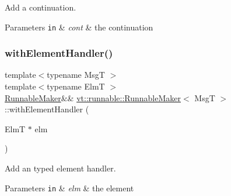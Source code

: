 Add a continuation. 


\begin{DoxyParams}[1]{Parameters}
\mbox{\tt in}  & {\em cont} & the continuation \\
\hline
\end{DoxyParams}
\mbox{\label{structvt_1_1runnable_1_1_runnable_maker_a1b37afe7a5ab185c29e85e0d6ebbbc82}} 
\subsubsection{\texorpdfstring{with\+Element\+Handler()}{withElementHandler()}}
{\footnotesize\ttfamily template$<$typename MsgT $>$ \\
template$<$typename ElmT $>$ \\
\hyperlink{structvt_1_1runnable_1_1_runnable_maker}{Runnable\+Maker}\&\& \hyperlink{structvt_1_1runnable_1_1_runnable_maker}{vt\+::runnable\+::\+Runnable\+Maker}$<$ MsgT $>$\+::with\+Element\+Handler (\begin{DoxyParamCaption}\item[{ElmT $\ast$}]{elm }\end{DoxyParamCaption})\hspace{0.3cm}{\ttfamily [inline]}}



Add an typed element handler. 


\begin{DoxyParams}[1]{Parameters}
\mbox{\tt in}  & {\em elm} & the element \\
\hline
\end{DoxyParams}
\mbox{\label{structvt_1_1runnable_1_1_runnable_maker_a64264db5615ea10efe02dbd1d8ec92ea}} 
